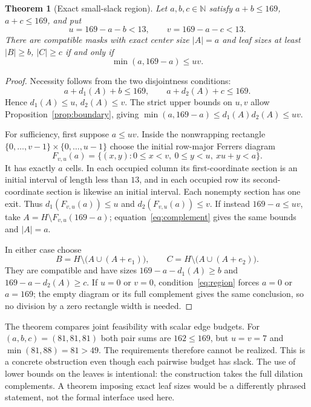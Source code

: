 \documentclass[11pt,a4paper]{article}
\newtheorem{theorem}{Theorem}[section]
\theoremstyle{definition}
\theoremstyle{remark}
\newcommand{\N}{\mathbb N}
\begin{document}
\begin{theorem}[Exact small-slack region]\label{thm:region}
Let $a,b,c\in\N$ satisfy $a+b\le169$, $a+c\le169$, and put
\[
 u=169-a-b<13,\qquad v=169-a-c<13.
\]
There are compatible masks with \emph{exact} center size $|A|=a$ and
leaf sizes \emph{at least} $|B|\ge b$, $|C|\ge c$ if and only if
\begin{equation}\label{eq:region}
 \min(a,169-a)\le uv.
\end{equation}
\end{theorem}
\begin{proof}
Necessity follows from the two disjointness conditions:
\[
 a+d_1(A)+b\le169,\qquad a+d_2(A)+c\le169.
\]
Hence $d_1(A)\le u$, $d_2(A)\le v$. The strict upper bounds on $u,v$
allow Proposition~\ref{prop:boundary}, giving
$\min(a,169-a)\le d_1(A)d_2(A)\le uv$.

For sufficiency, first suppose $a\le uv$. Inside the nonwrapping rectangle
$\{0,\ldots,v-1\}\times\{0,\ldots,u-1\}$ choose the initial row-major
Ferrers diagram
\begin{equation}\label{eq:ferrers}
 F_{v,u}(a)=\{(x,y):0\le x<v,\ 0\le y<u,\ xu+y<a\}.
\end{equation}
It has exactly $a$ cells. In each occupied column its first-coordinate
section is an initial interval of length less than $13$, and in each
occupied row its second-coordinate section is likewise an initial
interval. Each nonempty section has one exit. Thus
$d_1(F_{v,u}(a))\le u$ and $d_2(F_{v,u}(a))\le v$.
If instead $169-a\le uv$, take $A=H\setminus F_{v,u}(169-a)$;
equation~\eqref{eq:complement} gives the same bounds and $|A|=a$.

In either case choose
\begin{equation}\label{eq:maxleaves}
 B=H\setminus\bigl(A\cup(A+e_1)\bigr),\qquad
 C=H\setminus\bigl(A\cup(A+e_2)\bigr).
\end{equation}
They are compatible and have sizes $169-a-d_1(A)\ge b$ and
$169-a-d_2(A)\ge c$. If $u=0$ or $v=0$, condition~\eqref{eq:region}
forces $a=0$ or $a=169$; the empty diagram or its full complement gives
the same conclusion, so no division by a zero rectangle width is needed.
\end{proof}

The theorem compares joint feasibility with scalar edge budgets. For
$(a,b,c)=(81,81,81)$ both pair sums are $162\le169$, but $u=v=7$ and
$\min(81,88)=81>49$. The requirements therefore cannot be realized.
This is a concrete obstruction even though each pairwise budget has slack.
The use of lower bounds on the leaves is intentional: the construction
takes the full dilation complements. A theorem imposing exact leaf
sizes would be a differently phrased statement, not the formal interface
used here.
\end{document}
